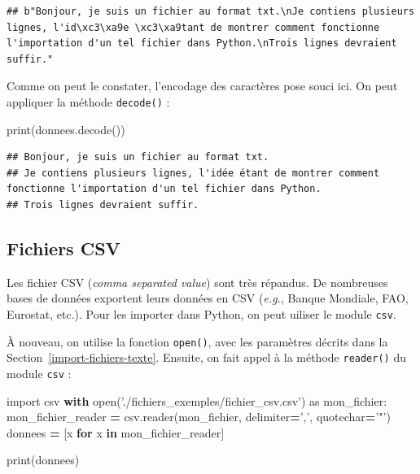\documentclass[12pt,]{book}
\newenvironment{Shaded}{\begin{snugshade}}{\end{snugshade}}
\newcommand{\KeywordTok}[1]{\textcolor[rgb]{0.13,0.29,0.53}{\textbf{#1}}}
\newcommand{\StringTok}[1]{\textcolor[rgb]{0.31,0.60,0.02}{#1}}
\newcommand{\ImportTok}[1]{#1}
\newcommand{\ControlFlowTok}[1]{\textcolor[rgb]{0.13,0.29,0.53}{\textbf{#1}}}
\newcommand{\OperatorTok}[1]{\textcolor[rgb]{0.81,0.36,0.00}{\textbf{#1}}}
\newcommand{\BuiltInTok}[1]{#1}
\newcommand{\NormalTok}[1]{#1}
\numberwithin{equation}{section}
\numberwithin{countremarque}{section}
\begin{document}
\begin{lstlisting}
## b"Bonjour, je suis un fichier au format txt.\nJe contiens plusieurs lignes, l'id\xc3\xa9e \xc3\xa9tant de montrer comment fonctionne l'importation d'un tel fichier dans Python.\nTrois lignes devraient suffir."
\end{lstlisting}

Comme on peut le constater, l'encodage des caractères pose souci ici. On
peut appliquer la méthode \texttt{decode()} :

\begin{Shaded}
\begin{Highlighting}[]
\BuiltInTok{print}\NormalTok{(donnees.decode())}
\end{Highlighting}
\end{Shaded}

\begin{lstlisting}
## Bonjour, je suis un fichier au format txt.
## Je contiens plusieurs lignes, l'idée étant de montrer comment fonctionne l'importation d'un tel fichier dans Python.
## Trois lignes devraient suffir.
\end{lstlisting}

\subsection{Fichiers CSV}\label{importation-fichiers-csv}

Les fichier CSV (\emph{comma separated value}) sont très répandus. De
nombreuses bases de données exportent leurs données en CSV (\emph{e.g.},
Banque Mondiale, FAO, Eurostat, etc.). Pour les importer dans Python, on
peut uiliser le module \texttt{csv}.

À nouveau, on utilise la fonction \texttt{open()}, avec les paramètres
décrits dans la Section~\ref{import-fichiers-texte}. Ensuite, on fait
appel à la méthode \texttt{reader()} du module \texttt{csv} :

\begin{Shaded}
\begin{Highlighting}[]
\ImportTok{import}\NormalTok{ csv}
\ControlFlowTok{with} \BuiltInTok{open}\NormalTok{(}\StringTok{'./fichiers_exemples/fichier_csv.csv'}\NormalTok{) }\ImportTok{as}\NormalTok{ mon_fichier:}
\NormalTok{  mon_fichier_reader }\OperatorTok{=}\NormalTok{ csv.reader(mon_fichier, delimiter}\OperatorTok{=}\StringTok{','}\NormalTok{, quotechar}\OperatorTok{=}\StringTok{'"'}\NormalTok{)}
\NormalTok{  donnees }\OperatorTok{=}\NormalTok{ [x }\ControlFlowTok{for}\NormalTok{ x }\KeywordTok{in}\NormalTok{ mon_fichier_reader]}

\BuiltInTok{print}\NormalTok{(donnees)}
\end{Highlighting}
\end{Shaded}
\end{document}
